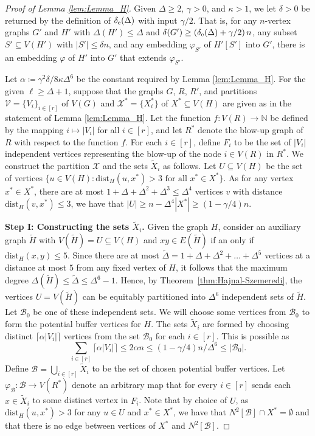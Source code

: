 \documentclass[final]{article}
\theoremstyle{definition}
\newcommand{\dist}{\mathrm{dist}}
\newcommand{\exth}{\delta_{\rm e}(\Delta)}
\let\tilde\widetilde
\begin{document}
\begin{proof}[Proof of Lemma \ref{lem:Lemma_H}]
    Given $\Delta \geq 2$, $\gamma > 0$, and $\kappa > 1$,
    we let $\delta>0$ be returned by the definition of $\exth$ with input $\gamma/2$. That is, for any $n$-vertex graphs $G'$ and $H'$ with $\Delta(H')\le\Delta$ and $\delta(G')\ge(\exth+\gamma/2)\,n$, any subset $S'\subseteq V(H')$ with $|S'|\le\delta n$, and any embedding $\varphi_{S'}$ of $H'[S']$ into $G'$, there is an embedding $\varphi$ of $H'$ into $G'$ that extends $\varphi_{S'}$.
    
    Let $\alpha \coloneq \gamma^2\delta/8 \kappa \Delta^6$ be the constant required by Lemma \ref{lem:Lemma_H}. For the given $\ell\geq \Delta+1$, suppose that the graphs $G$, $R$, $R'$, and partitions $\mathcal{V} = \{V_i\}_{i \in [r]}$ of $V(G)$ and $\mathcal{X}^* = \{X_i^*\}$ of $X^* \subseteq V(H)$ are given as in the statement of Lemma \ref{lem:Lemma_H}. Let the function $f: V(R) \to \mathbb{N}$ be defined by the mapping $i \mapsto |V_i|$ for all $i \in [r]$, and let $R^*$ denote the blow-up graph of $R$ with respect to the function $f$. For each $i \in [r]$, define $F_i$ to be the set of $|V_i|$ independent vertices representing the blow-up of the node $i \in V(R)$ in $R^*$. We construct the partition $\mathcal{X}$ and the sets $\tilde{X}_i$ as follows. Let $U \subseteq V(H)$ be the set of vertices $\{ u \in V(H) : \dist_H(u, x^*) > 3  \text{ for all } x^* \in X^*\}$. As for any vertex $x^* \in X^*$, there are at most $1 + \Delta + \Delta^2 + \Delta^3 \leq \Delta^4$ vertices $v$ with distance $\dist_H(v,x^*) \leq 3$, we have that $|U| \geq n - \Delta^4|X^*| \geq (1 - \gamma/4)n$.

    \textbf{Step I: Constructing the sets $\tilde{X}_i$.} Given the graph $H$, consider an auxiliary graph $\tilde{H}$ with $V(\tilde{H}) = U \subseteq V(H)$ and $xy \in E(\tilde{H})$ if an only if $\dist_H(x,y) \leq 5$. Since there are at most $\tilde{\Delta} = 1 + \Delta + \Delta^2 + \dots + \Delta^5$ vertices at a distance at most $5$ from any fixed vertex of $H$, it follows that the maximum degree $\Delta(\tilde{H}) \leq \tilde{\Delta} \leq \Delta^6 - 1$. Hence, by Theorem~\ref{thm:Hajnal-Szemeredi}, the vertices $U = V(\tilde{H})$ can be equitably partitioned into $\Delta^6$ independent sets of $\tilde{H}$. Let $\mathcal{B}_0$ be one of these independent sets. We will choose some vertices from $\mathcal{B}_0$ to form the potential buffer vertices for $H$. The sets $\tilde{X}_i$ are formed by choosing distinct $\bigl\lceil \alpha |V_i| \bigr\rceil$ vertices from the set $\mathcal{B}_0$ for each $i \in [r]$. This is possible as 
    $$\sum_{i \in [r]} \bigl\lceil \alpha |V_i| \bigr\rceil \leq 2\alpha n \leq  (1 - \gamma/4) n/\Delta^6  \leq |\mathcal{B}_0|.$$ 
    Define $\mathcal{B} = \bigcup_{i \in [r]} \tilde{X}_i$ to be the set of chosen potential buffer vertices. Let $\varphi_{\mathcal{B}}: \mathcal{B} \to V(R^*)$ denote an arbitrary map that for every $i \in [r]$ sends each $x \in \tilde{X}_i$ to some distinct vertex in $F_i$. Note that by choice of $U$, as $\dist_H(u, x^*) > 3$ for any $u \in U$ and $x^* \in X^*$, we have that $N^2[\mathcal{B}] \cap X^* = \emptyset$ and that there is no edge between vertices of $X^*$ and $N^2[\mathcal{B}]$. 
    

\end{proof}
\end{document}

